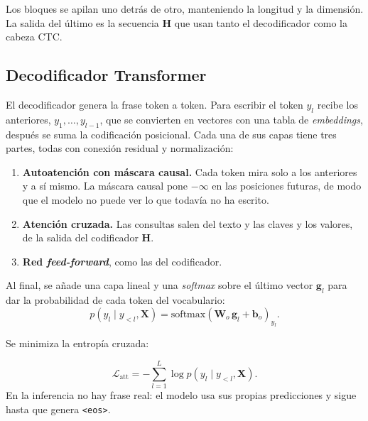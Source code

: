 Los bloques se apilan uno detrás de otro, manteniendo la longitud y la dimensión. La salida del último es la secuencia $\mathbf{H}$ que usan tanto el decodificador como la cabeza CTC.

\subsection{Decodificador Transformer}
\label{sec:decoder-teoria}

El decodificador genera la frase token a token. Para escribir el token $y_l$ recibe los anteriores, $y_1, \dots, y_{l-1}$, que se convierten en vectores con una tabla de \textit{embeddings}, después se suma la codificación posicional. Cada una de sus capas tiene tres partes, todas con conexión residual y normalización:

\begin{enumerate}[leftmargin=*, itemsep=0.3em]
  \item \textbf{Autoatención con máscara causal.} Cada token mira solo a los anteriores y a sí mismo. La máscara causal pone $-\infty$ en las posiciones futuras, de modo que el modelo no puede ver lo que todavía no ha escrito.
  \item \textbf{Atención cruzada.} Las consultas salen del texto y las claves y los valores, de la salida del codificador $\mathbf{H}$. 
  \item \textbf{Red \textit{feed-forward}}, como las del codificador.
\end{enumerate}

Al final, se añade una capa lineal y una \textit{softmax} sobre el último vector $\mathbf{g}_l$ para dar la probabilidad de cada token del vocabulario:
\begin{equation}
  p(y_l \mid y_{<l}, \mathbf{X}) = \mathrm{softmax}\left( \mathbf{W}_o\,\mathbf{g}_l + \mathbf{b}_o \right)_{y_l}.
  \label{eq:decoder}
\end{equation}

Se minimiza la entropía cruzada:

\begin{equation}
  \mathcal{L}_{\mathrm{att}} = -\sum_{l=1}^{L} \log p(y_l \mid y_{<l}, \mathbf{X}).
  \label{eq:loss-att}
\end{equation}
En la inferencia no hay frase real: el modelo usa sus propias predicciones y sigue hasta que genera \texttt{<eos>}.

